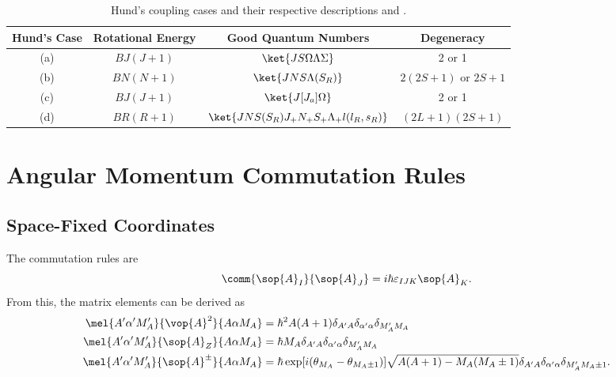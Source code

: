 \begin{table}[H]
    \centering
    \caption{Hund's coupling cases and their respective descriptions \cite[2]{hougenCalculationRotationalEnergy1970} and \cite[103]{lefebvre-brionSpectraDynamicsDiatomic2004}.}
    \begin{tabular}{cccc}
        \toprule
        \textbf{Hund's Case} & \textbf{Rotational Energy} & \textbf{Good Quantum Numbers}                 & \textbf{Degeneracy}     \\
        \midrule
        (a)                  & $BJ(J + 1)$                & $\ket{JS\Omega\Lambda\Sigma}$                 & 2 or 1                  \\
        (b)                  & $BN(N + 1)$                & $\ket{JNS\Lambda(S_R)}$                       & $2(2S + 1)$ or $2S + 1$ \\
        (c)                  & $BJ(J + 1)$                & $\ket{J[J_a]\Omega}$                          & 2 or 1                  \\
        (d)                  & $BR(R + 1)$                & $\ket{JNS(S_R)J_+N_+S_+\Lambda_+l(l_R, s_R)}$ & $(2L + 1)(2S + 1)$      \\
        \bottomrule
    \end{tabular}
\end{table}

\section{Angular Momentum Commutation Rules}

\subsection{Space-Fixed Coordinates}

The commutation rules are \cite[73]{lefebvre-brionSpectraDynamicsDiatomic2004}
\begin{equation*}
    \comm{\sop{A}_I}{\sop{A}_J} = i\hbar\varepsilon_{IJK}\sop{A}_K.
\end{equation*}
From this, the matrix elements can be derived as
\begin{align*}
    \mel{A'\alpha'M_A'}{\vop{A}^2}{A\alpha M_A}   & = \hbar^2A(A + 1)\delta_{A'A}\delta_{\alpha'\alpha}\delta_{M_A'M_A}                                                                        \\
    \mel{A'\alpha'M_A'}{\sop{A}_Z}{A\alpha M_A}   & = \hbar M_A\delta_{A'A}\delta_{\alpha'\alpha}\delta_{M_A'M_A}                                                                              \\
    \mel{A'\alpha'M_A'}{\sop{A}^\pm}{A\alpha M_A} & = \hbar\exp[i(\theta_{M_A} - \theta_{M_A \pm 1})]\sqrt{A(A + 1) - M_A(M_A \pm 1)}\delta_{A'A}\delta_{\alpha'\alpha}\delta_{M_A'M_A \pm 1}.
\end{align*}

